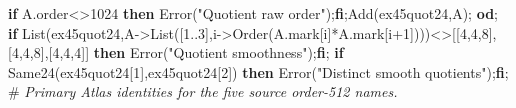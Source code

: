 \documentclass[
  10pt,
  letterpaper,
]{article}
\newenvironment{Shaded}{}{}
\newcommand{\BuiltInTok}[1]{\textcolor[rgb]{0.00,0.50,0.00}{#1}}
\newcommand{\CommentTok}[1]{\textcolor[rgb]{0.38,0.63,0.69}{\textit{#1}}}
\newcommand{\ControlFlowTok}[1]{\textcolor[rgb]{0.00,0.44,0.13}{\textbf{#1}}}
\newcommand{\FloatTok}[1]{\textcolor[rgb]{0.25,0.63,0.44}{#1}}
\newcommand{\NormalTok}[1]{#1}
\newcommand{\OperatorTok}[1]{\textcolor[rgb]{0.40,0.40,0.40}{#1}}
\newcommand{\StringTok}[1]{\textcolor[rgb]{0.25,0.44,0.63}{#1}}
\newcommand{\VariableTok}[1]{\textcolor[rgb]{0.10,0.09,0.49}{#1}}
\begin{document}
\begin{Shaded}
\begin{Highlighting}[]
 \ControlFlowTok{if} \VariableTok{A}\NormalTok{.}\VariableTok{order}\OperatorTok{\textless{}\textgreater{}}\FloatTok{1024} \ControlFlowTok{then} \BuiltInTok{Error}\NormalTok{(}\StringTok{"Quotient raw order"}\NormalTok{)}\OperatorTok{;}\ControlFlowTok{fi}\OperatorTok{;}\BuiltInTok{Add}\NormalTok{(}\VariableTok{ex45quot24}\OperatorTok{,}\VariableTok{A}\NormalTok{)}\OperatorTok{;}
\ControlFlowTok{od}\OperatorTok{;}
\ControlFlowTok{if} \BuiltInTok{List}\NormalTok{(}\VariableTok{ex45quot24}\OperatorTok{,}\VariableTok{A}\OperatorTok{{-}\textgreater{}}\BuiltInTok{List}\NormalTok{([}\FloatTok{1}\OperatorTok{..}\FloatTok{3}\NormalTok{]}\OperatorTok{,}\VariableTok{i}\OperatorTok{{-}\textgreater{}}\BuiltInTok{Order}\NormalTok{(}\VariableTok{A}\NormalTok{.}\VariableTok{mark}\NormalTok{[}\VariableTok{i}\NormalTok{]}\OperatorTok{*}\VariableTok{A}\NormalTok{.}\VariableTok{mark}\NormalTok{[}\VariableTok{i}\OperatorTok{+}\FloatTok{1}\NormalTok{])))}\OperatorTok{\textless{}\textgreater{}}\NormalTok{[[}\FloatTok{4}\OperatorTok{,}\FloatTok{4}\OperatorTok{,}\FloatTok{8}\NormalTok{]}\OperatorTok{,}\NormalTok{[}\FloatTok{4}\OperatorTok{,}\FloatTok{4}\OperatorTok{,}\FloatTok{8}\NormalTok{]}\OperatorTok{,}\NormalTok{[}\FloatTok{4}\OperatorTok{,}\FloatTok{4}\OperatorTok{,}\FloatTok{4}\NormalTok{]] }\ControlFlowTok{then} \BuiltInTok{Error}\NormalTok{(}\StringTok{"Quotient smoothness"}\NormalTok{)}\OperatorTok{;}\ControlFlowTok{fi}\OperatorTok{;}
\ControlFlowTok{if} \VariableTok{Same24}\NormalTok{(}\VariableTok{ex45quot24}\NormalTok{[}\FloatTok{1}\NormalTok{]}\OperatorTok{,}\VariableTok{ex45quot24}\NormalTok{[}\FloatTok{2}\NormalTok{]) }\ControlFlowTok{then} \BuiltInTok{Error}\NormalTok{(}\StringTok{"Distinct smooth quotients"}\NormalTok{)}\OperatorTok{;}\ControlFlowTok{fi}\OperatorTok{;}
\NormalTok{\#}\CommentTok{ Primary Atlas identities for the five source order{-}512 names.}


\end{Highlighting}
\end{Shaded}
\end{document}
